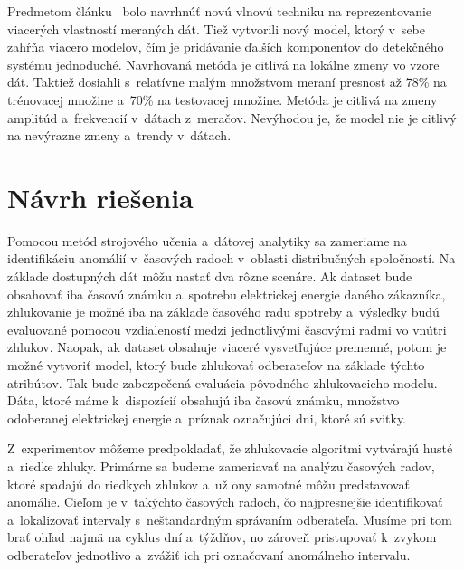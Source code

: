 \documentclass[a4paper,twoside,slovak,12pt,appendix]{article}
\begin{document}
Predmetom článku~\cite{Tagaris2002} bolo navrhnúť novú vlnovú techniku na
reprezentovanie viacerých vlastností meraných dát. Tiež vytvorili nový model,
ktorý v~sebe zahŕňa viacero modelov, čím je pridávanie ďalších komponentov do
detekčného systému jednoduché. Navrhovaná metóda je citlivá na lokálne zmeny vo
vzore dát. Taktiež dosiahli s~relatívne malým množstvom meraní presnosť až 78\%
na trénovacej množine a~70\% na testovacej množine. Metóda je citlivá na zmeny
amplitúd a~frekvencií v~dátach z~meračov. Nevýhodou je, že model nie je citlivý
na nevýrazne zmeny a~trendy v~dátach.\\



\newpage
\section{Návrh riešenia}
Pomocou metód strojového učenia a~dátovej analytiky sa zameriame na
identifikáciu anomálií v~časových radoch v~oblasti distribučných spoločností. Na
základe dostupných dát môžu nastať dva rôzne scenáre. Ak dataset bude obsahovať
iba časovú známku a~spotrebu elektrickej energie daného zákazníka, zhlukovanie
je možné iba na základe časového radu spotreby a~výsledky budú evaluované
pomocou vzdialeností medzi jednotlivými časovými radmi vo vnútri zhlukov.
Naopak, ak dataset obsahuje viaceré vysvetľujúce premenné, potom je možné
vytvoriť model, ktorý bude zhlukovať odberateľov na základe týchto atribútov.
Tak bude zabezpečená evaluácia pôvodného zhlukovacieho modelu. Dáta, ktoré máme
k~dispozícií obsahujú iba časovú známku, množstvo odoberanej elektrickej energie
a~príznak označujúci dni, ktoré sú svitky.

Z~experimentov môžeme predpokladať, že zhlukovacie algoritmi vytvárajú husté
a~riedke zhluky. Primárne sa budeme zameriavať na analýzu časových radov,
ktoré spadajú do riedkych zhlukov a~už ony samotné môžu predstavovať anomálie.
Cieľom je v~takýchto časových radoch, čo najpresnejšie identifikovať
a~lokalizovať intervaly s~neštandardným správaním odberateľa. Musíme pri tom
brať ohľad najmä na cyklus dní a~týždňov, no zároveň pristupovať k~zvykom
odberateľov jednotlivo a~zvážiť ich pri označovaní anomálneho intervalu.
\end{document}
